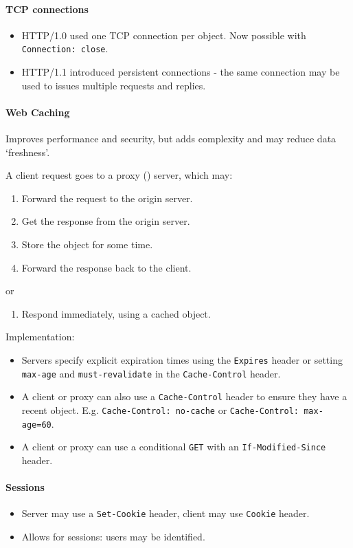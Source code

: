 \documentclass[twocolumn,english]{article}
\let\emph\relax
\begin{document}
\paragraph{TCP connections}
\begin{itemize}
\item HTTP/1.0 used one TCP connection per object. Now possible with \texttt{Connection: close}.
\item HTTP/1.1 introduced persistent connections - the same connection may
be used to issues multiple requests and replies.
\end{itemize}

\paragraph{Web Caching}

Improves performance and security, but adds complexity and may reduce
data `freshness'.

A client request goes to a proxy (\emph{cache}) server, which may:
\begin{enumerate}
\item Forward the request to the origin server.
\item Get the response from the origin server.
\item Store the object for some time.
\item Forward the response back to the client.
\end{enumerate}
or
\begin{enumerate}
\item Respond immediately, using a cached object.
\end{enumerate}
Implementation:
\begin{itemize}
\item Servers specify explicit expiration times using the \texttt{Expires}
header or setting \texttt{max-age} and \texttt{must-revalidate} in
the \texttt{Cache-Control} header.
\item A client or proxy can also use a \texttt{Cache-Control} header to
ensure they have a recent object. E.g. \texttt{Cache-Control: no-cache}
or \texttt{Cache-Control: max-age=60}.
\item A client or proxy can use a conditional \texttt{GET} with an \texttt{If-Modified-Since}
header.
\end{itemize}

\paragraph{Sessions}
\begin{itemize}
\item Server may use a \texttt{Set-Cookie} header, client may use \texttt{Cookie}
header.
\item Allows for sessions: users may be identified.
\end{itemize}
\end{document}
